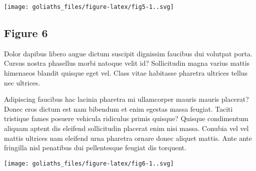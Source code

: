 \documentclass[
]{article}
\begin{document}
\texttt{[image: goliaths\_files/figure-latex/fig5-1..svg]}

\hypertarget{figure-6}{%
\subsection{Figure 6}\label{figure-6}}

Dolor dapibus libero augue dictum suscipit dignissim faucibus dui
volutpat porta. Cursus nostra phasellus morbi natoque velit id?
Sollicitudin magna varius mattis himenaeos blandit quisque eget vel.
Class vitae habitasse pharetra ultrices tellus nec ultrices.

Adipiscing faucibus hac lacinia pharetra mi ullamcorper mauris mauris
placerat? Donec eros dictum est nam bibendum et enim egestas massa
feugiat. Taciti tristique fames posuere vehicula ridiculus primis
quisque? Quisque condimentum aliquam aptent dis eleifend sollicitudin
placerat enim nisi massa. Conubia vel vel mattis ultrices nam eleifend
urna pharetra ornare donec aliquet mattis. Ante ante fringilla nisl
penatibus dui pellentesque feugiat dis torquent.

\texttt{[image: goliaths\_files/figure-latex/fig6-1..svg]}
\end{document}

